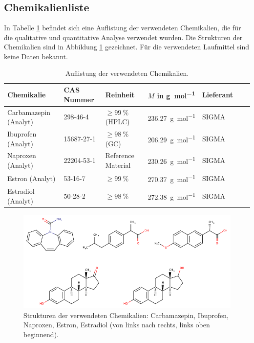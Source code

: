  \subsection{Chemikalienliste} \label{sec:Chemikalien}
  
    In Tabelle \ref{tab:Chemikalien} befindet sich eine Auflistung der verwendeten Chemikalien, die für die qualitative und quantitative Analyse verwendet wurden. Die Strukturen der Chemikalien sind in Abbildung \ref{fig:Strukturen} gezeichnet. Für die verwendeten Laufmittel sind keine Daten bekannt. 
    
      \begin{table}[H]
        \centering
        \caption[Auflistung der verwendeten Chemikalien, Quelle: Autor]{Auflistung der verwendeten Chemikalien.}
      
        \label{tab:Chemikalien}
        \begin{tabular}{@{}l|llllp{4.5cm}l@{}}
          \toprule
          Chemikalie & CAS Nummer & Reinheit & $M$ in \si{\gram\per\mole} & Lieferant \\ \midrule
           Carbamazepin (Analyt)  & 298-46-4 & $\geq \SI[mode=text]{99}{\percent}$ (HPLC) & \SI[mode=text]{236.27}{\gram\per\mole} & SIGMA \\
           Ibuprofen (Analyt)  & 15687-27-1 & $\geq \SI[mode=text]{98}{\percent}$ (GC) & \SI[mode=text]{206.29}{\gram\per\mole} & SIGMA \\
           Naproxen (Analyt) & 22204-53-1 & Reference Material & \SI[mode=text]{230.26}{\gram\per\mole} & SIGMA \\
           Estron (Analyt) & 53-16-7 & $\geq \SI[mode=text]{99}{\percent}$ & \SI[mode=text]{270.37}{\gram\per\mole} & SIGMA \\
           Estradiol (Analyt) & 50-28-2 & $\geq \SI[mode=text]{98}{\percent}$ & \SI[mode=text]{272.38}{\gram\per\mole} & SIGMA \\ \bottomrule
        \end{tabular}
      \end{table}
    
      \begin{figure}[H]
        \includegraphics[scale=0.45, center]{images/Structures.png} 
        \caption[Strukturen der verwendeten Chemikalien, Quelle: Autor]{Strukturen der verwendeten Chemikalien: Carbamazepin, Ibuprofen, Naproxen, Estron, Estradiol (von links nach rechts, links oben beginnend).}
        \label{fig:Strukturen}
      \end{figure}
    
